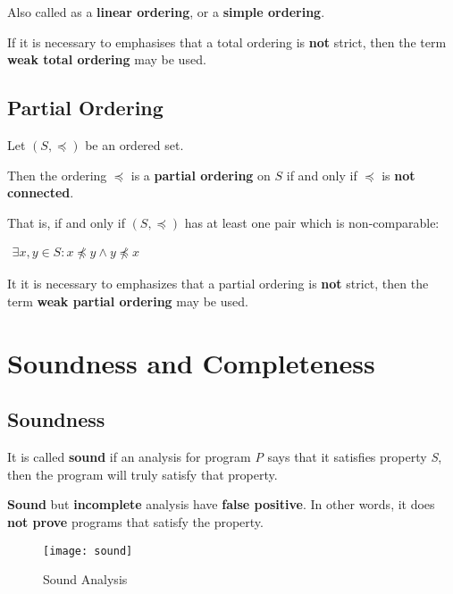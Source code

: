 Also called as a \textbf{linear ordering}, or a \textbf{simple
  ordering}.

If it is necessary to emphasises that a total ordering is \textbf{not}
strict, then the term \textbf{weak total ordering} may be used.


\subsection{Partial Ordering}

Let $(S, \preceq)$ be an ordered set.

Then the ordering $\preceq$ is a \textbf{partial ordering} on $S$ if
and only if $\preceq$ is \textbf{not connected}.

That is, if and only if $(S, \preceq)$ has at least one pair which is
non-comparable:

\begin{math}
  \begin{array}{c}
    \exists x, y \in S : x \npreceq y \land y \npreceq x
  \end{array}
\end{math}


It it is necessary to emphasizes that a partial ordering is
\textbf{not} strict, then the term \textbf{weak partial ordering} may
be used.



\section{Soundness and Completeness}

\subsection{Soundness}


It is called \textbf{sound} if an analysis for program \textsl{P} says
that it satisfies property \textsl{S}, then the program will truly
satisfy that property.

\textbf{Sound} but \textbf{incomplete} analysis have \textbf{false
  positive}. In other words, it does \textbf{not prove} programs that
satisfy the property.

\begin{figure}[h]
  \texttt{[image: sound]}
  \caption{Sound Analysis}
  \label{fig:sound}
\end{figure}

